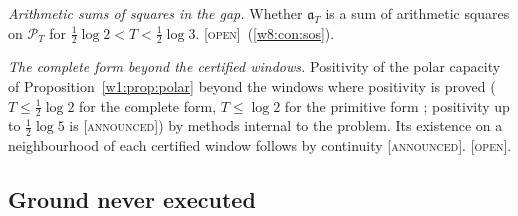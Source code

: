\documentclass[11pt]{amsart}
\theoremstyle{definition}
\theoremstyle{remark}
\numberwithin{equation}{section}
\newcommand{\PT}{\mathcal{P}_T}                        %
\newcommand{\aT}{\mathfrak{a}_T}                       %
\newcommand{\stag}[1]{\textsc{[#1]}}
\newcommand{\OPENQ}{\stag{open}}
\newcommand{\ANNOUNCED}{\stag{announced}}
\begin{document}
\emph{Arithmetic sums of squares in the gap.} Whether $\aT$ is a sum of arithmetic squares on $\PT$ for
$\frac12\log2<T<\frac12\log3$. \OPENQ\ (\ref{w8:con:sos}).

\emph{The complete form beyond the certified windows.} Positivity of the polar capacity of
Proposition~\ref{w1:prop:polar} beyond the windows where positivity is proved ($T\le\frac12\log2$ for the complete form, $T\le\log2$ for the primitive form \cite{P42}; positivity up to $\frac12\log5$ is \ANNOUNCED) by methods internal to the problem. Its existence on a neighbourhood
of each certified window follows by continuity \ANNOUNCED. \OPENQ.

\subsection{Ground never executed}
\end{document}
